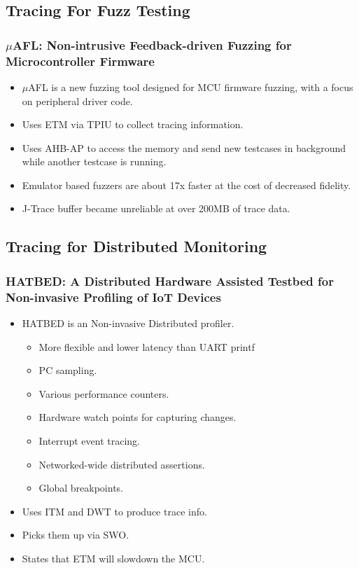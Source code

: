 \documentclass{beamer}
\begin{document}
\subsection{Tracing For Fuzz Testing}
\begin{frame}
    \frametitle{$\mu$AFL: Non-intrusive Feedback-driven Fuzzing
    for Microcontroller Firmware}
    \begin{itemize}
        \item $\mu$AFL is a new fuzzing tool designed for MCU firmware fuzzing,
            with a focus on peripheral driver code. \cite{li2022muafl}
        \item Uses ETM via TPIU to collect tracing information.
        \item Uses AHB-AP to access the memory and send new testcases
            in background while another testcase is running.
        \item Emulator based fuzzers are about 17x faster at the cost of
            decreased fidelity.
        \item J-Trace buffer became unreliable at over 200MB of trace data.     \end{itemize}
\end{frame}

\subsection{Tracing for Distributed Monitoring}
\begin{frame}
    \frametitle{HATBED: A Distributed Hardware Assisted Testbed
    for Non-invasive Profiling of IoT Devices}
    \begin{itemize}
        \item HATBED is an Non-invasive Distributed profiler. \cite{li2018hatbed}
            \begin{itemize}
                \item More flexible and lower latency than UART printf
                \item PC sampling.
                \item Various performance counters.
                \item Hardware watch points for capturing changes.
                \item Interrupt event tracing.
                \item Networked-wide distributed assertions.
                \item Global breakpoints.
            \end{itemize}
        \item Uses ITM and DWT to produce trace info.
        \item Picks them up via SWO.
        \item States that ETM will slowdown the MCU. 
    \end{itemize}
\end{frame}
\end{document}
